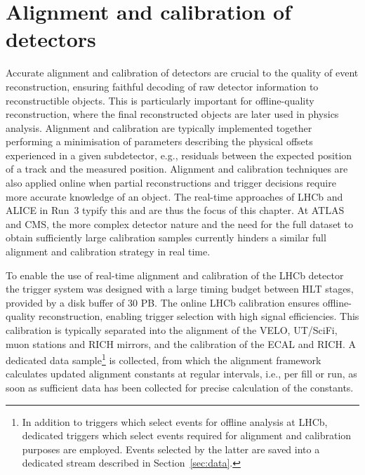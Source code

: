 \section{Alignment and calibration of detectors}

Accurate alignment and calibration of detectors are crucial to the quality of event reconstruction, ensuring faithful decoding of raw detector information to reconstructible objects. This is particularly important for offline-quality reconstruction, where the final reconstructed objects are later used in physics analysis. Alignment and calibration are typically implemented together %
performing a minimisation of parameters describing the physical offsets experienced in a given subdetector, e.g., residuals between the expected position of a track and the measured position. Alignment and calibration techniques are also applied online when partial reconstructions and trigger decisions require more accurate knowledge of an object. The real-time approaches of LHCb and ALICE in Run~3 typify this and are thus the focus of this chapter. 
At ATLAS and CMS, the more complex detector nature and the need for the full dataset to obtain sufficiently large calibration samples currently hinders a similar full alignment and calibration strategy in real time.

To enable the use of real-time alignment and calibration of the LHCb detector the trigger system was designed with a large timing budget between HLT stages, provided by a disk buffer of 30 PB. The online LHCb calibration ensures offline-quality reconstruction, enabling trigger selection with high signal efficiencies. This calibration is typically separated into the alignment of the VELO, UT/SciFi, muon stations and RICH mirrors, and the calibration of the ECAL and RICH. A dedicated data sample\footnote{In addition to triggers which select events for offline analysis at LHCb, dedicated triggers which select events required for alignment and calibration purposes are employed. Events selected by the latter are saved into a dedicated stream described in Section~\ref{sec:data}.} is collected, from which the alignment framework calculates updated alignment constants at regular intervals, i.e., per fill or run, as soon as sufficient data has been collected for precise calculation of the constants.

